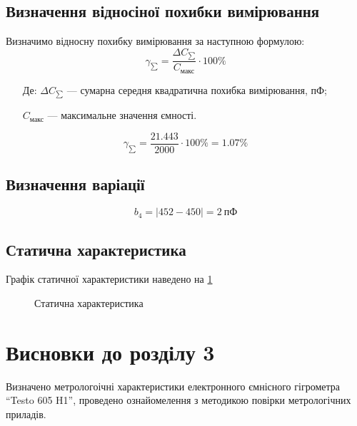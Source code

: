 \subsection{Визначення відносіної похибки вимірювання}
Визначимо відносну похибку вимірювання за наступною формулою:
\begin{equation}
    \gamma_{\sum} = \frac{\Delta C_{\sum}}{C_{\text{макс}}} \cdot 100\%
\end{equation}
\begin{itemize}
\item [Де:] $\Delta C_{\sum}$ --- сумарна середня квадратична похибка вимірювання, пФ;
\item []$C_{\text{макс}}$ ---  максимальне значення ємності.
\end{itemize}
\begin{equation}
    \gamma_{\sum} = \frac{21.443}{2000} \cdot 100\%= 1.07\%
\end{equation}

\subsection{Визначення варіації}
\begin{equation}
    b_4 = |452 - 450| = 2~\text{пФ}
\end{equation}
\subsection{Статична характеристика}

Графік статичної характеристики наведено на \ref{fig:static_c}

\begin{figure}[htb]
\caption{Статична характеристика}
 \label{fig:static_c}
\end{figure}
\newpage
\section*{Висновки до розділу 3}

Визначено метрологоічні характеристики електронного ємнісного гігрометра ``Testo 605 H1'', проведено
ознайомелення з методикою повірки метрологічних приладів.
